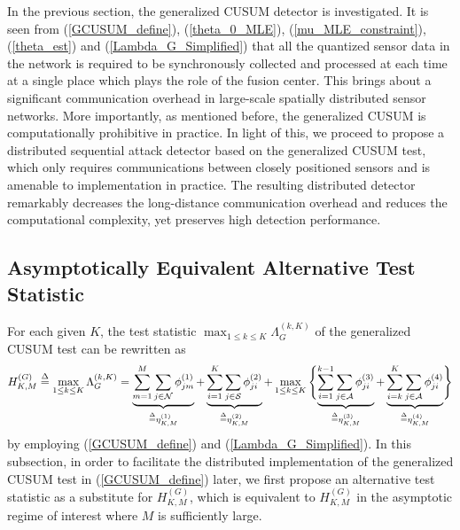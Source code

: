 \documentclass[11pt, draftclsnofoot, onecolumn]{IEEEtran}
\begin{document}
In the previous section, the generalized CUSUM detector is investigated. It is seen from (\ref{GCUSUM_define}), (\ref{theta_0_MLE}), (\ref{mu_MLE_constraint}), (\ref{theta_est}) and (\ref{Lambda_G_Simplified}) that all the quantized sensor data in the network is required to be synchronously collected and processed at each time at a single place which plays the role of the fusion center. This brings about a significant communication overhead in large-scale spatially distributed sensor networks.   More importantly, as mentioned before, the generalized CUSUM is computationally prohibitive in practice.  
In light of this, we proceed to propose a distributed sequential attack detector based on the generalized CUSUM test,   which only requires  communications between closely positioned sensors and is  amenable to implementation in practice.   The resulting distributed detector remarkably decreases the long-distance communication overhead   and reduces the computational complexity,    yet preserves high detection performance.  

\subsection{Asymptotically Equivalent Alternative Test Statistic}



For each given $K$, the test statistic $ {\max }_{1 \le k \le K} \Lambda _G^{(k,K)}$ of the generalized CUSUM test can be rewritten as
\begin{equation} \label{H_G_Define}
H_{K,M}^{\left( G \right)} \buildrel \Delta \over = \mathop {\max }\limits_{1 \le k \le K} \Lambda _G^{(k,K)} = \underbrace {\sum\limits_{m = 1}^M {\sum\limits_{j \in {\cal N}} {\phi _{jm}^{\left( 1 \right)}} } }_{ \buildrel \Delta \over = \eta _{K,M}^{(1)}} + \underbrace {\sum\limits_{i = 1}^K {\sum\limits_{j \in {\cal S}} {\phi _{ji}^{\left( 2 \right)}} } }_{ \buildrel \Delta \over = \eta _{K,M}^{(2)}} + \mathop {\max }\limits_{1 \le k \le K} \Bigg\{ {\underbrace {\sum\limits_{i = 1}^{k - 1} {\sum\limits_{j \in {\cal A}} {\phi _{ji}^{\left( 3 \right)}} } }_{ \buildrel \Delta \over = \eta _{K,M}^{(3)}} + \underbrace {\sum\limits_{i = k}^K {\sum\limits_{j \in {\cal A}} {\phi _{ji}^{\left( 4 \right)}} } }_{ \buildrel \Delta \over = \eta _{K,M}^{(4)}}} \Bigg\}
\end{equation}
by employing (\ref{GCUSUM_define}) and (\ref{Lambda_G_Simplified}).   In this subsection, in order to facilitate the distributed implementation of the generalized CUSUM test in (\ref{GCUSUM_define}) later, we first propose an alternative test statistic as a substitute for $H_{K,M}^{\left( G \right)}$, which is equivalent to $H_{K,M}^{\left( G \right)}$ in the asymptotic regime of interest where $M$ is sufficiently large.  
\end{document}
